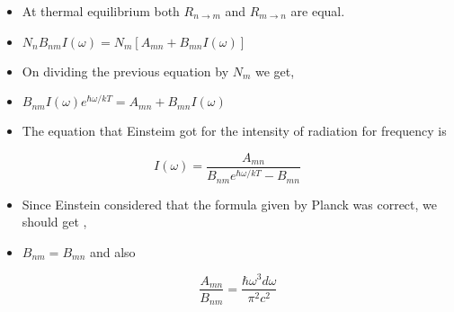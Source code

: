 \documentclass[aspectratio=169]{beamer}
\begin{document}
\begin{frame}{}

	\begin{itemize}

		\item At thermal equilibrium both $ R_{n \to m} $ and $ R_{m \to n} $ are equal.  \newline
		\item $ N_{n} B_{nm} I(\omega) = N_{m} [A_{mn} + B_{mn} I(\omega)] $ \newline
		\item On dividing the previous equation by $ N_{m} $ we get, 
		
	\end{itemize}
	
\end{frame}

\begin{frame}{}

	\begin{itemize}

		\item $ B_{nm} I(\omega) e^{\hbar \omega /kT} = A_{mn} + B_{mn} I(\omega) $ \newline
		\item The equation that Einsteim got for the intensity of radiation for frequency is 
		
	\end{itemize}
	
		\begin{equation}
				 I(\omega) = \frac{A_{mn}}{B_{nm} e^{\hbar \omega / kT} - B_{mn} }	 
		\end{equation}
		
\end{frame}

\begin{frame}{}

	\begin{itemize}

		\item Since Einstein considered that the formula given by Planck was correct, we should get , \newline
		\item  $ B_{nm} = B_{mn} $  and also
		
			\begin{flushleft}
			
				 \[\frac{A_{mn}}{B_{nm}} = \frac{\hbar \omega^3 d\omega}{ \pi^2 c^2} \] 

			\end{flushleft}
			
	\end{itemize}
	
\end{frame}
\end{document}
